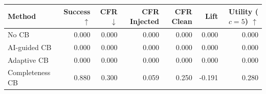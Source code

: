 \begin{tabular}{lrrrrrr}
\toprule
Method & Success $\uparrow$ & CFR $\downarrow$ & CFR Injected & CFR Clean & Lift & Utility ($c=5$) $\uparrow$ \\
\midrule
No CB & 0.000 & 0.000 & 0.000 & 0.000 & 0.000 & 0.000 \\
AI-guided CB & 0.000 & 0.000 & 0.000 & 0.000 & 0.000 & 0.000 \\
Adaptive CB & 0.000 & 0.000 & 0.000 & 0.000 & 0.000 & 0.000 \\
Completeness CB & 0.880 & 0.300 & 0.059 & 0.250 & -0.191 & 0.280 \\
\bottomrule
\end{tabular}
